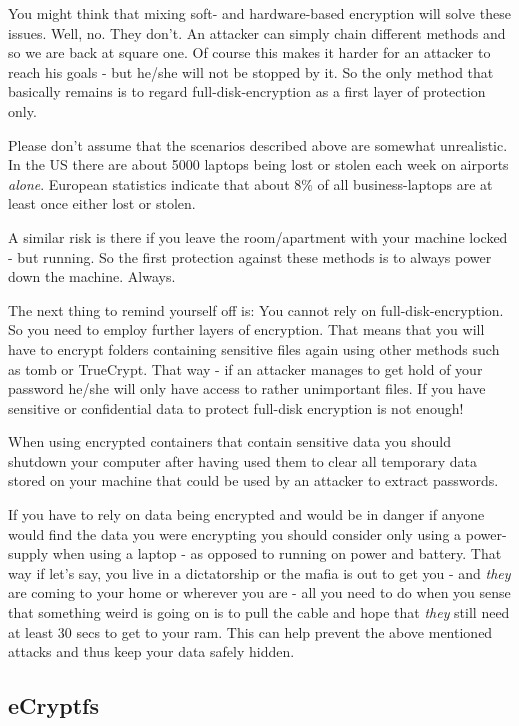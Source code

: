 \documentclass{article}
\begin{document}
 You might think that mixing soft- and hardware-based encryption will solve these issues. Well, no. They don't. An attacker can simply chain different methods and so we are back at square one. Of course this makes it harder for an attacker to reach his goals - but he/she will not be stopped by it. So the only method that basically remains is to regard full-disk-encryption as a first layer of protection only. 


 Please don't assume that the scenarios described above are somewhat unrealistic. In the US there are about 5000 laptops being lost or stolen each week on airports \emph{alone}. European statistics indicate that about 8\% of all business-laptops are at least once either lost or stolen. 


 A similar risk is there if you leave the room/apartment with your machine locked - but running. So the first protection against these methods is to always power down the machine. Always. 


 The next thing to remind yourself off is: You cannot rely on full-disk-encryption. So you need to employ further layers of encryption. That means that you will have to encrypt folders containing sensitive files again using other methods such as tomb or TrueCrypt. That way - if an attacker manages to get hold of your password he/she will only have access to rather unimportant files. If you have sensitive or confidential data to protect full-disk encryption is not enough!


 When using encrypted containers that contain sensitive data you should shutdown your computer after having used them to clear all temporary data stored on your machine that could be used by an attacker to extract passwords.


 If you have to rely on data being encrypted and would be in danger if anyone would find the data you were encrypting you should consider only using a power-supply when using a laptop - as opposed to running on power and battery. That way if let's say, you live in a dictatorship or the mafia is out to get you - and \emph{they} are coming to your home or wherever you are - all you need to do when you sense that something weird is going on is to pull the cable and hope that \emph{they} still need at least 30 secs to get to your ram. This can help prevent the above mentioned attacks and thus keep your data safely hidden.
\subsection{eCryptfs}
\end{document}
